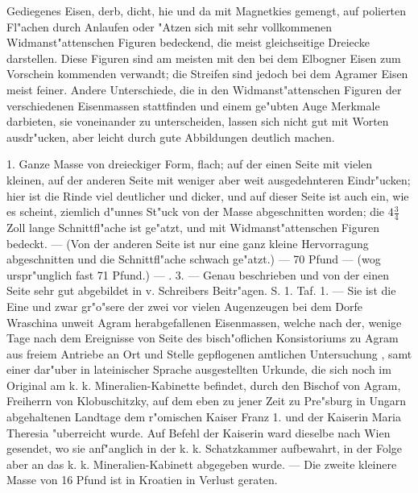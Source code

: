 \documentclass[a4paper, 11pt, oneside, polutonikogreek, german]{article}
\begin{document}
Gediegenes Eisen, derb, dicht, hie und da mit Magnetkies gemengt, auf polierten Fl"achen durch Anlaufen oder "Atzen sich mit sehr vollkommenen Widmanst"attenschen Figuren bedeckend, die meist gleichseitige Dreiecke darstellen. Diese Figuren sind am meisten mit den bei dem Elbogner Eisen zum Vorschein kommenden verwandt; die Streifen sind jedoch bei dem Agramer Eisen meist feiner. Andere Unterschiede, die in den Widmanst"attenschen Figuren der verschiedenen Eisenmassen stattfinden und einem ge"ubten Auge Merkmale darbieten, sie voneinander zu unterscheiden, lassen sich nicht gut mit Worten ausdr"ucken, aber leicht durch gute Abbildungen deutlich machen.

1. Ganze Masse von dreieckiger Form, flach; auf der einen Seite mit vielen kleinen, auf der anderen Seite mit weniger aber weit ausgedehnteren Eindr"ucken; hier ist die Rinde viel deutlicher und dicker, und auf dieser Seite ist auch ein, wie es scheint, ziemlich d"unnes St"uck von der Masse abgeschnitten worden; die $4\frac{3}{4}$ Zoll lange Schnittfl"ache ist ge"atzt, und mit Widmanst"attenschen Figuren bedeckt. --- (Von der anderen Seite ist nur eine ganz kleine Hervorragung abgeschnitten und die Schnittfl"ache schwach ge"atzt.) --- 70 Pfund --- (wog urspr"unglich fast 71 Pfund.) --- . 3. --- Genau beschrieben und von der einen Seite sehr gut abgebildet in v. Schreibers Beitr"agen. S. 1. Taf. 1. --- Sie ist die Eine und zwar gr"o"sere der zwei vor vielen Augenzeugen bei dem Dorfe Wraschina unweit Agram herabgefallenen Eisenmassen, welche nach der, wenige Tage nach dem Ereignisse von Seite des bisch"oflichen Konsistoriums zu Agram aus freiem Antriebe an Ort und Stelle gepflogenen amtlichen Untersuchung , samt einer dar"uber in lateinischer Sprache ausgestellten Urkunde, die sich noch im Original am k. k. Mineralien-Kabinette befindet, durch den Bischof von Agram, Freiherrn von Klobuschitzky, auf dem eben zu jener Zeit zu Pre"sburg in Ungarn abgehaltenen Landtage dem r"omischen Kaiser Franz 1. und der Kaiserin Maria Theresia "uberreicht wurde. Auf Befehl der Kaiserin ward dieselbe nach Wien gesendet, wo sie anf"anglich in der k. k. Schatzkammer aufbewahrt, in der Folge aber an das k. k. Mineralien-Kabinett abgegeben wurde. --- Die zweite kleinere Masse von 16 Pfund ist in Kroatien in Verlust geraten.

\setlength{\leftskip}{10mm}
\setlength{\parindent}{0pt}
\end{document}
